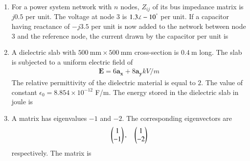 \documentclass[journal,12pt,onecolumn]{IEEEtran}
\theoremstyle{remark}
\begin{document}
\begin{enumerate}
\item For a power system network with $n$ nodes, $Z_{ij}$ of its bus impedance matrix is $j0.5$ per unit. The voltage at node $3$ is $1.3 \angle -10^\degree$ per unit. If a capacitor having reactance of $-j3.5$ per unit is now added to the network between node $3$ and the reference node, the current drawn by the capacitor per unit is

\begin{enumerate}
\end{enumerate}


\item A dielectric slab with $500~\text{mm} \times 500~\text{mm}$ cross-section is $0.4~\text{m}$ long. The slab is subjected to a uniform electric field of 
\begin{align*}
    \mathbf{E} = 6 \mathbf{a_x} + 8 \mathbf{a_y}kV/m
\end{align*}
The relative permittivity of the dielectric material is equal to $2$. The value of constant $\epsilon_0 = 8.854 \times 10^{-12}$ F/m. The energy stored in the dielectric slab in joule is

\begin{enumerate}
\end{enumerate}

\item A matrix has eigenvalues $-1$ and $-2$. The corresponding eigenvectors are 
\[
\begin{pmatrix} 1 \\ -1 \end{pmatrix}, 
\quad
\begin{pmatrix} 1 \\ -2 \end{pmatrix}
\]
respectively. The matrix is

\begin{enumerate}
\begin{multicols}{2}
    


\end{multicols}
\end{enumerate}
\end{enumerate}
\end{document}
